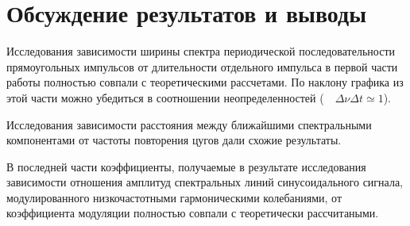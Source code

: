 \documentclass[a4paper,12pt]{article} %
\begin{document}
\section{Обсуждение результатов и выводы}

Исследования зависимости ширины спектра периодической последовательности прямоугольных импульсов от длительности отдельного импульса в первой части работы полностью совпали с теоретическими рассчетами. По наклону графика из этой части можно убедиться в соотношении неопределенностей ($\quad \Delta \nu \Delta t \simeq 1$).
 
Исследования зависимости расстояния между ближайшими спектральными компонентами от частоты повторения цугов дали схожие результаты. 

В последней части коэффициенты, получаемые в результате исследования зависимости отношения амплитуд спектральных линий синусоидального сигнала, модулированного низкочастотными гармоническими колебаниями, от коэффициента модуляции полностью совпали с теоретически рассчитаными. 
\end{document}
